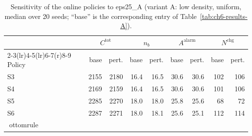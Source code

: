 \begin{table}[htbp]
\centering
\caption{Sensitivity of the online policies to eps25_A (variant A: low density, uniform,
median over 20 seeds; ``base'' is the corresponding entry of
Table~\ref{tab:ch6-results-A}).}
\label{tab:ch6-sens-A-eps25}
\footnotesize
\begin{tabular}{@{}l rr rr rr rr@{}}
\toprule
& \multicolumn{2}{c}{$C^{\mathrm{tot}}$} & \multicolumn{2}{c}{$n_b$}
  & \multicolumn{2}{c}{$A^{\mathrm{alarm}}$} & \multicolumn{2}{c}{$N^{\mathrm{chg}}$} \\
\cmidrule(r){2-3}\cmidrule(lr){4-5}\cmidrule(lr){6-7}\cmidrule(r){8-9}
Policy & base & pert. & base & pert. & base & pert. & base & pert. \\
\midrule

S3 & 2155 & 2180 & 16.4 & 16.5 & 30.6 & 30.6 & 102 & 106 \\
S4 & 2169 & 2159 & 16.4 & 16.5 & 30.6 & 30.6 & 101 & 106 \\
S5 & 2285 & 2270 & 18.0 & 18.0 & 25.8 & 25.6 & 68 & 72 \\
S6 & 2287 & 2271 & 18.0 & 18.1 & 25.6 & 25.1 & 112 & 114 \\
ottomrule
\end{tabular}
\end{table}
